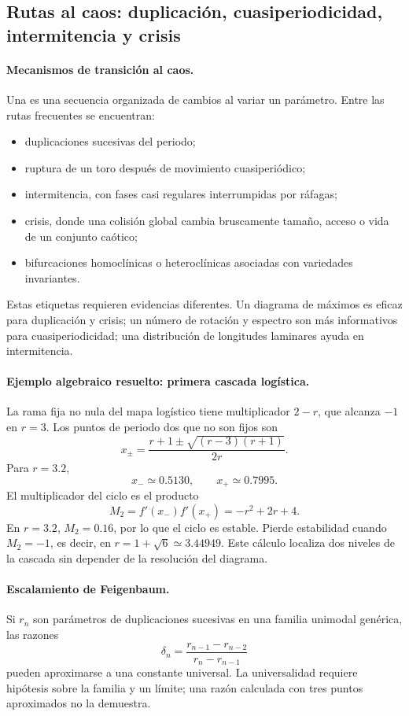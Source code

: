 \subsection{Rutas al caos: duplicación, cuasiperiodicidad, intermitencia y crisis}

\paragraph{Mecanismos de transición al caos.}
Una  es una secuencia organizada de cambios al variar un
parámetro. Entre las rutas frecuentes se encuentran:
\begin{itemize}
  \item duplicaciones sucesivas del periodo;
  \item ruptura de un toro después de movimiento cuasiperiódico;
  \item intermitencia, con fases casi regulares interrumpidas por ráfagas;
  \item crisis, donde una colisión global cambia bruscamente tamaño, acceso o vida de
  un conjunto caótico;
  \item bifurcaciones homoclínicas o heteroclínicas asociadas con variedades
  invariantes.
\end{itemize}
Estas etiquetas requieren evidencias diferentes. Un diagrama de máximos es eficaz
para duplicación y crisis; un número de rotación y espectro son más informativos para
cuasiperiodicidad; una distribución de longitudes laminares ayuda en intermitencia.

\paragraph{Ejemplo algebraico resuelto: primera cascada logística.}
La rama fija no nula del mapa logístico tiene multiplicador \(2-r\), que alcanza
\(-1\) en \(r=3\). Los puntos de periodo dos que no son fijos son
\[
 x_\pm=\frac{r+1\pm\sqrt{(r-3)(r+1)}}{2r}.
\]
Para \(r=3.2\),
\[
 x_-\simeq0.5130,\qquad x_+\simeq0.7995.
\]
El multiplicador del ciclo es el producto
\[
 M_2=f'(x_-)f'(x_+)=-r^2+2r+4.
\]
En \(r=3.2\), \(M_2=0.16\), por lo que el ciclo es estable. Pierde estabilidad
cuando \(M_2=-1\), es decir, en \(r=1+\sqrt6\simeq3.44949\). Este cálculo localiza
dos niveles de la cascada sin depender de la resolución del diagrama.

\paragraph{Escalamiento de Feigenbaum.}
Si \(r_n\) son parámetros de duplicaciones sucesivas en una familia unimodal
genérica, las razones
\[
 \delta_n=\frac{r_{n-1}-r_{n-2}}{r_n-r_{n-1}}
\]
pueden aproximarse a una constante universal. La universalidad requiere hipótesis
sobre la familia y un límite; una razón calculada con tres puntos aproximados no la
demuestra.

